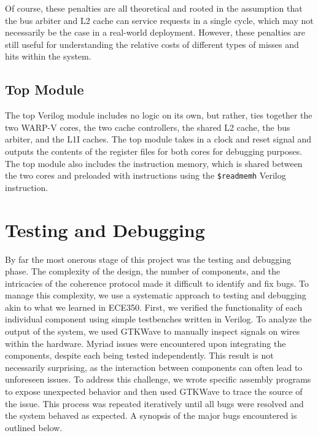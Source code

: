 \documentclass[10pt, compsoc]{IEEEtran}
\begin{document}
Of course, these penalties are all theoretical and rooted in the assumption that the bus arbiter and L2 cache can service requests in a single cycle, which may not necessarily be the case in a real-world deployment. However, these penalties are still useful for understanding the relative costs of different types of misses and hits within the system.





\subsection{Top Module}

The top Verilog module includes no logic on its own, but rather, ties together the two WARP-V cores, the two cache controllers, the shared L2 cache, the bus arbiter, and the L1I caches. The top module takes in a clock and reset signal and outputs the contents of the register files for both cores for debugging purposes. The top module also includes the instruction memory, which is shared between the two cores and preloaded with instructions using the \texttt{\$readmemh} Verilog instruction.









\section{Testing and Debugging}\label{sec:Verification}

By far the most onerous stage of this project was the testing and debugging phase. The complexity of the design, the number of components, and the intricacies of the coherence protocol made it difficult to identify and fix bugs. To manage this complexity, we use a systematic approach to testing and debugging akin to what we learned in ECE350. First, we verified the functionality of each individual component using simple testbenches written in Verilog. To analyze the output of the system, we used GTKWave to manually inspect signals on wires within the hardware. Myriad issues were encountered upon integrating the components, despite each being tested independently. This result is not necessarily surprising, as the interaction between components can often lead to unforeseen issues. To address this challenge, we wrote specific assembly programs to expose unexpected behavior and then used GTKWave to trace the source of the issue. This process was repeated iteratively until all bugs were resolved and the system behaved as expected. A synopsis of the major bugs encountered is outlined below. 
\end{document}
